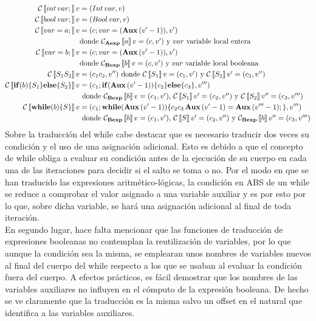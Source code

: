\begin{align*}
  \mathcal{C}\left\llbracket int\, var\mbox{;\,} \right\rrbracket v &= (Int\, var, v) \\
  \mathcal{C}\left\llbracket bool\, var\mbox{;\,} \right\rrbracket v &= (Bool\, var, v) \\
  \mathcal{C}\left\llbracket var = a\mbox{;\,} \right\rrbracket v &= (c\mbox{;\,} var = (\textbf{Aux}\, (v' - 1)), v') \\
  & \mbox{donde $\mathcal{C}_{\textbf{Aexp}}\left\llbracket a \right\rrbracket v = (c, v')$ y $var$ variable local entera} \\
  \mathcal{C}\left\llbracket var = b\mbox{;\,} \right\rrbracket v &= (c\mbox{;\,} var = (\textbf{Aux}\, (v' - 1)), v') \\
  & \mbox{donde $\mathcal{C}_{\textbf{Bexp}}\left\llbracket b \right\rrbracket v = (c, v')$ y $var$ variable local booleana} \\
  \mathcal{C}\left\llbracket S_1 S_2 \right\rrbracket v &= (c_1 c_2, v'') \mbox{ donde $\mathcal{C}\left\llbracket S_1 \right\rrbracket v = (c_1, v')$ y $\mathcal{C}\left\llbracket S_2 \right\rrbracket v' = (c_2, v'')$} \\
  \mathcal{C}\left\llbracket \mbox{\textbf{if}} (b) \{S_1\} \mbox{\textbf{else}} \{S_2\} \right\rrbracket v &= (c_1\mbox{;\,} \mbox{\textbf{if}} (\textbf{Aux}\, (v' - 1)) \{c_2\} \mbox{\textbf{else}} \{c_3\}, v''') \\
  & \mbox{ donde $\mathcal{C}_{\textbf{Bexp}}\left\llbracket b \right\rrbracket v = (c_1, v')$, $\mathcal{C}\left\llbracket S_1 \right\rrbracket v' = (c_2, v'')$ y $\mathcal{C}\left\llbracket S_2 \right\rrbracket v'' = (c_3, v''')$} \\
  \mathcal{C}\left\llbracket \mbox{\textbf{while}} (b) \{S\} \right\rrbracket v &= (c_1\mbox{;\,} \mbox{\textbf{while}} (\textbf{Aux}\, (v' - 1)) \{c_2 c_3\, \textbf{Aux}\, (v' - 1) = \textbf{Aux}\, (v''' - 1)\mbox{;\,}\}, v''') \\
  & \mbox{ donde $\mathcal{C}_{\textbf{Bexp}}\left\llbracket b \right\rrbracket v = (c_1, v')$, $\mathcal{C}\left\llbracket S \right\rrbracket v' = (c_2, v'')$ y $\mathcal{C}_{\textbf{Bexp}}\left\llbracket b \right\rrbracket v'' = (c_3, v''')$}
\end{align*}
Sobre la traducción del while cabe destacar que es necesario traducir dos veces su condición y el uso de una asignación adicional. Esto es debido a que el concepto de while obliga a evaluar su condición antes de la ejecución de su cuerpo en cada una de las iteraciones para decidir si el salto se toma o no. Por el modo en que se han traducido las expresiones aritmético-lógicas, la condición en ABS de un while se reduce a comprobar el valor asignado a una variable auxiliar y es por esto por lo que, sobre dicha variable, se hará una asignación adicional al final de toda iteración.\\

En segundo lugar, hace falta mencionar que las funciones de traducción de expresiones booleanas no contemplan la reutilización de variables, por lo que aunque la condición sea la misma, se emplearan unos nombres de variables nuevos al final del cuerpo del while respecto a los que se usaban al evaluar la condición fuera del cuerpo. A efectos prácticos, es fácil demostrar que los nombres de las variables auxiliares no influyen en el cómputo de la expresión booleana. De hecho se ve claramente que la traducción es la misma salvo un offset en el natural que identifica a las variables auxiliares.\\

